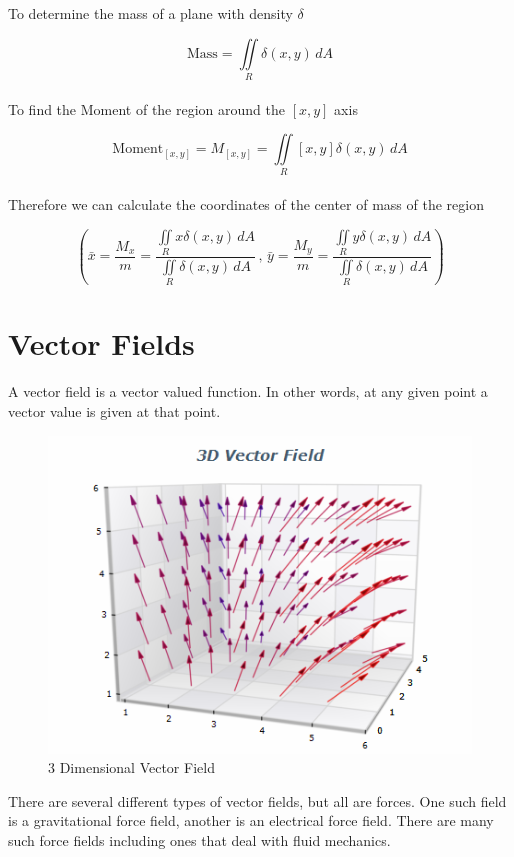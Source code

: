 \documentclass{article}
\begin{document}
To determine the mass of a plane with density $ \delta $

\begin{equation}
\text{Mass} = \iint\limits_R \delta (x,y) \, dA
\end{equation}\\

To find the Moment of the region around the $[x,y]$ axis

\begin{equation}
\text{Moment}_{[x,y]} = M_{[x,y]} = \iint\limits_R [x,y]\delta(x,y) \, dA
\end{equation}\\

Therefore we can calculate the coordinates of the center of mass of the region

\begin{equation}
\left( \bar{x} = \frac{M_x}{m} = \frac{\iint\limits_R x \delta(x,y) \, dA}{\iint\limits_R \delta (x,y) \, dA} \, , \,
\bar{y} = \frac{M_y}{m} = \frac{\iint\limits_R y \delta(x,y) \, dA}{\iint\limits_R \delta (x,y) \, dA} \right)
\end{equation}
\section{Vector Fields}
A vector field is a vector valued function. In other words, at any given point a vector value is given at that point.\\
\begin{figure}[ht]
\centering
    \includegraphics[scale=0.5]{3D-Vector-Field-chart.png}
\caption{3 Dimensional Vector Field}
\end{figure}
There are several different types of vector fields, but all are forces. One such field is a gravitational force field, another is an electrical force field. There are many such force fields including ones that deal with fluid mechanics.
\end{document}
